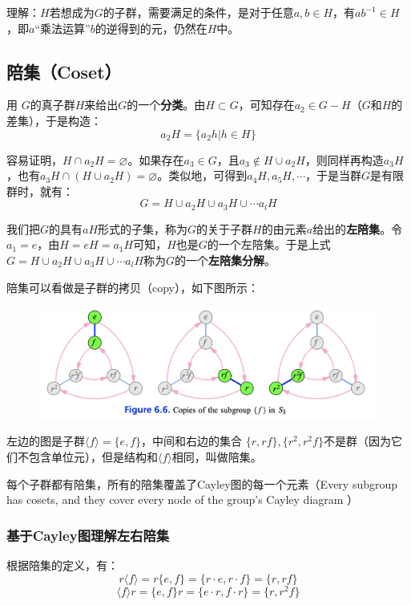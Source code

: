 \documentclass[12pt]{article}
\begin{document}
\begin{framed}
\small{
理解：$H$若想成为$G$的子群，需要满足的条件，是对于任意$a,b \in H$，有$ab^{-1} \in H$，即$a$“乘法运算”$b$的逆得到的元，仍然在$H$中。
}
\end{framed}

\subsection{陪集（Coset）}
用 $G$的真子群$H$来给出$G$的一个\textbf{分类}。由$H \subset G$，可知存在$a_2 \in G - H$（$G$和$H$的差集），于是构造：
$$
a_2H = \{a_2h | h \in H\}
$$

容易证明，$H \cap a_2H = \varnothing$。如果存在$a_3 \in G$，且$a_3 \notin H\cup a_2H$，则同样再构造$a_3H$，也有$a_3H \cap (H \cup a_2H) = \varnothing$。类似地，可得到$a_4H, a_5H, \cdots$，于是当群$G$是有限群时，就有：
$$
G = H \cup a_2H \cup a_3H \cup \cdots a_lH
$$

我们把$G$的具有$aH$形式的子集，称为$G$的关于子群$H$的由元素$a$给出的\textbf{左陪集}。令$a_1 = e$，由$H = eH = a_1H$可知，$H$也是$G$的一个左陪集。于是上式$G = H \cup a_2H \cup a_3H \cup \cdots a_lH$称为$G$的一个\textbf{左陪集分解}。

陪集可以看做是子群的拷贝（copy），如下图所示：
\begin{figure}[H]
    \centering
    \includegraphics[width=1\textwidth]{fig/Group/Cayley-Copy-Of-Subgroup.png}
\end{figure}
左边的图是子群$\langle f \rangle = \{e, f\}$，中间和右边的集合 $\{r, rf\}, \{r^2, r^2f\}$不是群（因为它们不包含单位元），但是结构和$\langle f \rangle$相同，叫做陪集。

\begin{framed}
每个子群都有陪集，所有的陪集覆盖了Cayley图的每一个元素（Every subgroup has cosets, and they cover every node of the group's Cayley diagram ）
\end{framed}

\subsubsection{基于Cayley图理解左右陪集}
根据陪集的定义，有：
$$
r \langle f \rangle = r \{ e, f \} = \{ r \cdot e, r \cdot f\} = \{r, rf\}
$$
$$
\langle f \rangle r = \{ e, f \} r = \{ e \cdot r, f \cdot r\} = \{r, r^2f\}
$$
\end{document}
